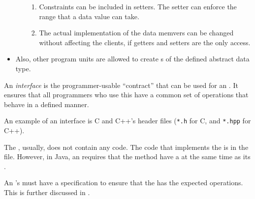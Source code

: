 \begin{definition}
\begin{itemize}[noitemsep]
\begin{itemize}[noitemsep]
\begin{enumerate}[noitemsep]
      \item Constraints can be included in setters. The setter can enforce the range that a data value can take.
      \item The actual implementation of the data memvers can be changed without affecting the clients, if getters and setters are the only access.
      \end{enumerate}
    \end{itemize}
  \item Also, other program units are allowed to create s of the defined abstract data type.
  \end{itemize}
\end{definition}

\begin{definition}[Interface]\label{def:ADT_Interface}
  An \emph{interface} is the programmer-usable ``contract'' that can be used for an .
  It ensures that all programmers who use this  have a common set of operations that behave in a defined manner.

  An example of an interface is C and C++'s header files (\texttt{*.h} for C, and \texttt{*.hpp} for C++).

  \begin{remark}
    The , usually, does not contain any code.
    The code that implements the  is in the  file.
    However, in Java, an  requires that the method have a  at the same time as its .
  \end{remark}

  \begin{remark}\label{rmk:ADT_Interface_Specification}
    An 's  must have a specification to ensure that the  has the expected operations.
    This is further discussed in .
  \end{remark}
\end{definition}

